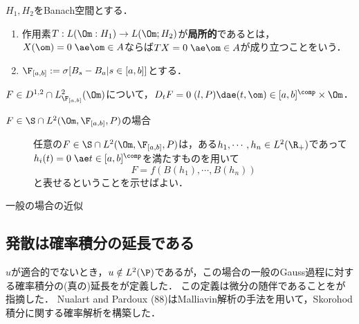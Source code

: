 \documentclass[uplatex,dvipdfmx]{jsreport}
\begin{document}
\begin{definition}
    $H_1,H_2$をBanach空間とする．
    \begin{enumerate}
        \item 作用素$T:L(\Om:H_1)\to L(\Om;H_2)$が\textbf{局所的}であるとは，$X(\om)=0\;\ae \om\in A$ならば$TX=0\;\ae\om\in A$が成り立つことをいう．
        \item $\F_{[a,b]}:=\sigma[B_s-B_a|s\in[a,b]]$とする．
    \end{enumerate}
\end{definition}

\begin{lemma}[Malliavin微分の局所性]
    $F\in D^{1,2}\cap L^2_{\F_{[a,b]}}(\Om)$について，$D_tF=0\;(l,P)\dae(t,\om)\in[a,b]^\comp\times\Om$．
\end{lemma}
\begin{Proof}\mbox{}
    \begin{description}
        \item[$F\in\S\cap L^2(\Om,\F_{[a,b]},P)$の場合] 任意の$F\in\S\cap L^2(\Om,\F_{[a,b]},P)$は，ある$h_1,\cdots,h_n\in L^2(\R_+)$であって$h_i(t)=0\;\ae t\in[a,b]^\comp$を満たすものを用いて
        \[F=f(B(h_1),\cdots,B(h_n))\]
        と表せるということを示せばよい．
        \item[一般の場合の近似] 
    \end{description}
\end{Proof}

\begin{lemma}
    
\end{lemma}

\subsection{発散は確率積分の延長である}

\begin{tcolorbox}[colframe=ForestGreen, colback=ForestGreen!10!white,breakable,colbacktitle=ForestGreen!40!white,coltitle=black,fonttitle=\bfseries\sffamily,
title=]
    $u$が適合的でないとき，$u\notin L^2(\P)$であるが，この場合の一般のGauss過程に対する確率積分の(真の)延長を\cite{Skorokhod75-GeneralizationOfStochasticIntegral}が定義した．
    この定義は微分の随伴であることを\cite{Gaveau-Trauber82}が指摘した．
    Nualart and Pardoux (88)はMalliavin解析の手法を用いて，Skorohod積分に関する確率解析を構築した．
\end{tcolorbox}
\end{document}
